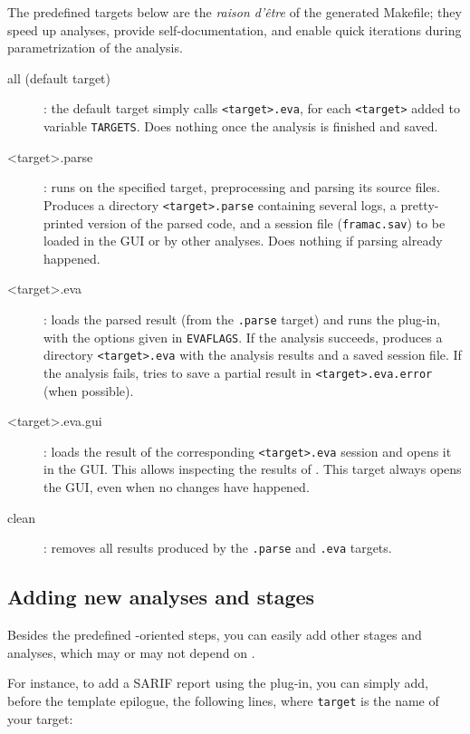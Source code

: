 The predefined targets below are the {\em raison d'être} of the generated
Makefile; they speed up analyses, provide self-documentation, and enable
quick iterations during parametrization of the analysis.

\begin{description}
\item[all (default target)]: the default target simply calls
  \texttt{<target>.eva}, for each \texttt{<target>} added to variable
  \texttt{TARGETS}. Does nothing once the analysis is finished and saved.
\item[<target>.parse]: runs \FramaC on the specified target, preprocessing
  and parsing its source files. Produces a directory \texttt{<target>.parse}
  containing several logs, a pretty-printed version of the parsed code, and
  a \FramaC session file (\texttt{framac.sav}) to be loaded in the GUI or by
  other analyses. Does nothing if parsing already happened.
\item[<target>.eva]: loads the parsed result (from the \texttt{.parse} target)
  and runs the \Value plug-in, with the options given in \texttt{EVAFLAGS}.
  If the analysis succeeds, produces a directory \texttt{<target>.eva} with the
  analysis results and a saved session file.
  If the analysis fails, tries to save a partial result in
  \texttt{<target>.eva.error} (when possible).
\item[<target>.eva.gui]: loads the result of the corresponding
  \texttt{<target>.eva} session and opens it in the GUI. This allows inspecting
  the results of \Value. This target always opens the GUI, even when no
  changes have happened.
\item[clean]: removes all results produced by the \texttt{.parse} and
  \texttt{.eva} targets.
\end{description}

\subsection{Adding new analyses and stages}

Besides the predefined \Value-oriented steps, you can easily add other stages
and analyses, which may or may not depend on \Value.

For instance, to add a SARIF report using the  plug-in,
you can simply add, before the template epilogue, the following lines, where
\texttt{target} is the name of your target:


